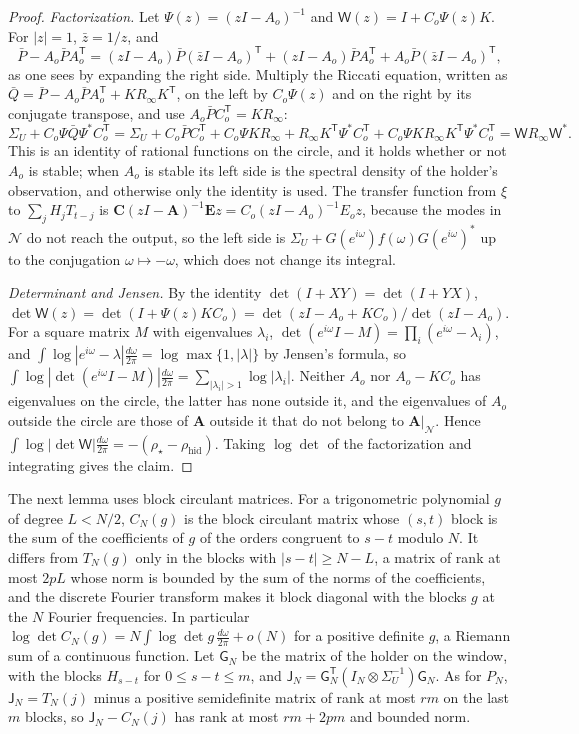 \documentclass[11pt,onecolumn]{IEEEtran}
\newcommand{\dw}{\tfrac{d\omega}{2\pi}}
\newcommand{\bA}{\mathbf A}
\newcommand{\bC}{\mathbf C}
\newcommand{\bE}{\mathbf E}
\newcommand{\rhid}{\rho_{\mathrm{hid}}}
\begin{document}
\begin{proof}
\emph{Factorization.} Let $\Psi(z)=(zI-A_o)^{-1}$ and
$\mathsf W(z)=I+C_o\Psi(z)K$. For $|z|=1$, $\bar z=1/z$, and
\[
\bar P-A_o\bar PA_o^{\mathsf T}=(zI-A_o)\bar P(\bar zI-A_o)^{\mathsf T}+(zI-A_o)\bar PA_o^{\mathsf T}+A_o\bar P(\bar zI-A_o)^{\mathsf T},
\]
as one sees by expanding the right side. Multiply the Riccati equation,
written as $\bar Q=\bar P-A_o\bar PA_o^{\mathsf T}+KR_\infty K^{\mathsf T}$,
on the left by $C_o\Psi(z)$ and on the right by its conjugate transpose,
and use $A_o\bar PC_o^{\mathsf T}=KR_\infty$:
\[
\Sigma_U+C_o\Psi\bar Q\Psi^*C_o^{\mathsf T}
=\Sigma_U+C_o\bar PC_o^{\mathsf T}+C_o\Psi KR_\infty+R_\infty K^{\mathsf T}\Psi^*C_o^{\mathsf T}+C_o\Psi KR_\infty K^{\mathsf T}\Psi^*C_o^{\mathsf T}
=\mathsf W R_\infty\mathsf W^*.
\]
This is an identity of rational functions on the circle, and it holds
whether or not $A_o$ is stable; when $A_o$ is stable its left side is
the spectral density of the holder's observation, and otherwise only
the identity is used. The transfer function from $\xi$ to
$\sum_jH_jT_{t-j}$ is $\bC(zI-\bA)^{-1}\bE z=C_o(zI-A_o)^{-1}E_oz$,
because the modes in $\mathcal N$ do not reach the output, so the left
side is $\Sigma_U+G(e^{i\omega})f(\omega)G(e^{i\omega})^*$ up to the
conjugation $\omega\mapsto-\omega$, which does not change its integral.

\emph{Determinant and Jensen.} By the identity
$\det(I+XY)=\det(I+YX)$,
$\det\mathsf W(z)=\det(I+\Psi(z)KC_o)=\det(zI-A_o+KC_o)/\det(zI-A_o)$.
For a square matrix $M$ with eigenvalues $\lambda_i$,
$\det(e^{i\omega}I-M)=\prod_i(e^{i\omega}-\lambda_i)$, and
$\int\log|e^{i\omega}-\lambda|\dw=\log\max\{1,|\lambda|\}$ by Jensen's
formula, so
$\int\log|\det(e^{i\omega}I-M)|\dw=\sum_{|\lambda_i|>1}\log|\lambda_i|$.
Neither $A_o$ nor $A_o-KC_o$ has eigenvalues on the circle, the latter
has none outside it, and the eigenvalues of $A_o$ outside the circle
are those of $\bA$ outside it that do not belong to $\bA|_{\mathcal N}$.
Hence $\int\log|\det\mathsf W|\dw=-(\rho_\star-\rhid)$. Taking $\log\det$
of the factorization and integrating gives the claim.
\end{proof}

The next lemma uses block circulant matrices. For a trigonometric
polynomial $g$ of degree $L<N/2$, $C_N(g)$ is the block circulant matrix
whose $(s,t)$ block is the sum of the coefficients of $g$ of the orders
congruent to $s-t$ modulo $N$. It differs from $T_N(g)$ only in the
blocks with $|s-t|\ge N-L$, a matrix of rank at most $2pL$ whose norm is
bounded by the sum of the norms of the coefficients, and the discrete
Fourier transform makes it block diagonal with the blocks $g$ at the
$N$ Fourier frequencies. In particular
$\log\det C_N(g)=N\int\log\det g\,\dw+o(N)$ for a positive definite $g$,
a Riemann sum of a continuous function. Let $\mathsf G_N$ be the matrix
of the holder on the window, with the blocks $H_{s-t}$ for
$0\le s-t\le m$, and
$\mathsf J_N=\mathsf G_N^{\mathsf T}(I_N\otimes\Sigma_U^{-1})\mathsf G_N$.
As for $P_N$, $\mathsf J_N=T_N(j)$ minus a positive semidefinite matrix
of rank at most $rm$ on the last $m$ blocks, so
$\mathsf J_N-C_N(j)$ has rank at most $rm+2pm$ and bounded norm.
\end{document}
